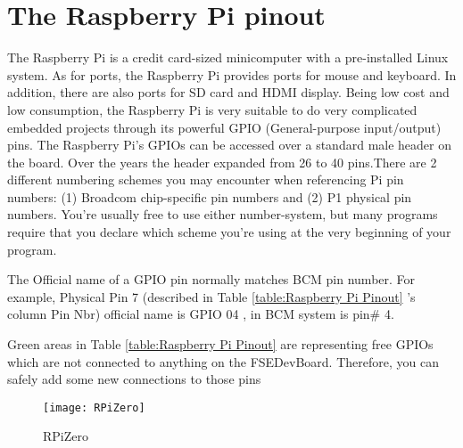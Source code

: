 \documentclass[
10pt, %
a4paper, %
oneside, %
headinclude,footinclude, %
BCOR=5mm, %
table,
]{scrartcl}
\begin{document}
\section{The Raspberry Pi pinout}

The Raspberry Pi is a credit card-sized minicomputer with a pre-installed Linux system. As for ports, the Raspberry Pi provides ports for mouse and keyboard. In addition, there are also ports for SD card and HDMI display. Being low cost and low consumption, the Raspberry Pi is very suitable to do very complicated embedded projects through its powerful GPIO (General-purpose input/output) pins. The Raspberry Pi's GPIOs can be accessed over a standard male header on the board. Over the years the header expanded from 26 to 40 pins.There are 2 different numbering schemes you may encounter when referencing Pi pin numbers: (1) Broadcom chip-specific pin numbers and (2) P1 physical pin numbers. You’re usually free to use either number-system, but many programs require that you declare which scheme you’re using at the very beginning of your program. 

The Official name of a GPIO pin normally matches BCM pin number. For example, Physical Pin 7 (described in Table \ref{table:Raspberry Pi Pinout} 's column Pin Nbr) official name is GPIO 04 , in BCM system is pin\# 4.

Green areas in Table \ref{table:Raspberry Pi Pinout} are representing free GPIOs which are not connected to anything on the FSEDevBoard. Therefore, you can safely add some new connections to those pins

\begin{figure}[H]
\centering
\texttt{[image: RPiZero]} 
\caption[RPiZero]{RPiZero}
\label{fig:RPiZero}
\end{figure}
\end{document}

